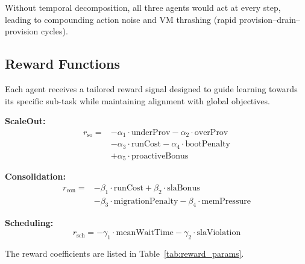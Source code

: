\documentclass[conference]{IEEEtran}
\begin{document}
Without temporal decomposition, all three agents would act at every step,
leading to compounding action noise and VM thrashing (rapid
provision--drain--provision cycles).

\subsection{Reward Functions}
\label{sec:rewards}

Each agent receives a tailored reward signal designed to guide learning towards
its specific sub-task while maintaining alignment with global objectives.

\noindent\textbf{ScaleOut:}
\begin{equation}
\begin{split}
  r_{\text{so}} = &-\alpha_1 \cdot \text{underProv} - \alpha_2 \cdot \text{overProv}\\
                  &- \alpha_3 \cdot \text{runCost} - \alpha_4 \cdot \text{bootPenalty}\\
                  &+ \alpha_5 \cdot \text{proactiveBonus}
\end{split}
\end{equation}

\noindent\textbf{Consolidation:}
\begin{equation}
\begin{split}
  r_{\text{con}} = &-\beta_1 \cdot \text{runCost} + \beta_2 \cdot \text{slaBonus}\\
                   &- \beta_3 \cdot \text{migrationPenalty} - \beta_4 \cdot \text{memPressure}
\end{split}
\end{equation}

\noindent\textbf{Scheduling:}
\begin{equation}
  r_{\text{sch}} = -\gamma_1 \cdot \text{meanWaitTime} - \gamma_2 \cdot \text{slaViolation}
\end{equation}

The reward coefficients are listed in Table~\ref{tab:reward_params}.
\end{document}
